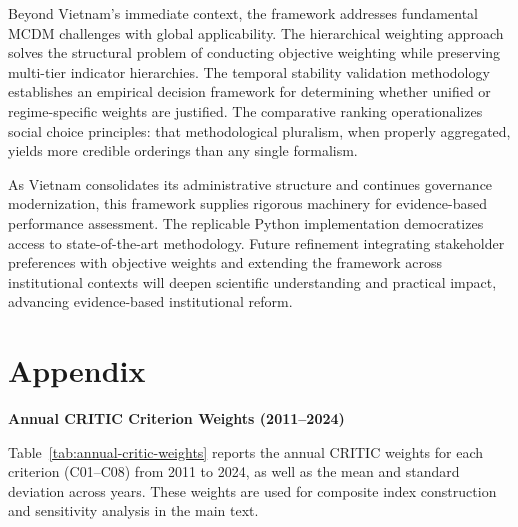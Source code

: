 \documentclass[12pt,a4paper]{article}
\begin{document}
Beyond Vietnam's immediate context, the framework addresses fundamental MCDM challenges with global applicability. The hierarchical weighting approach solves the structural problem of conducting objective weighting while preserving multi-tier indicator hierarchies. The temporal stability validation methodology establishes an empirical decision framework for determining whether unified or regime-specific weights are justified. The comparative ranking operationalizes social choice principles: that methodological pluralism, when properly aggregated, yields more credible orderings than any single formalism.

As Vietnam consolidates its administrative structure and continues governance modernization, this framework supplies rigorous machinery for evidence-based performance assessment. The replicable Python implementation democratizes access to state-of-the-art methodology. Future refinement integrating stakeholder preferences with objective weights and extending the framework across institutional contexts will deepen scientific understanding and practical impact, advancing evidence-based institutional reform.

\section{Appendix}

\textbf{Annual CRITIC Criterion Weights (2011--2024)}

Table~\ref{tab:annual-critic-weights} reports the annual CRITIC weights for each criterion (C01--C08) from 2011 to 2024, as well as the mean and standard deviation across years. These weights are used for composite index construction and sensitivity analysis in the main text.




\printbibliography
\end{document}
